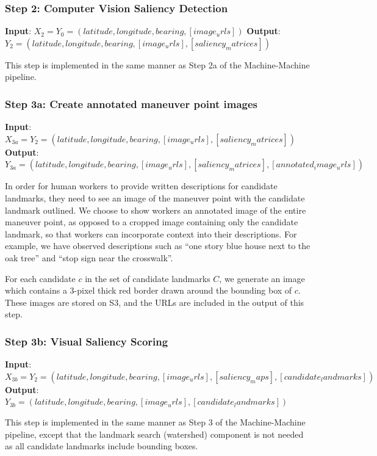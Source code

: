 \subsubsection*{Step 2: Computer Vision Saliency Detection}
\textbf{Input}: $X_2 = Y_0 = (latitude, longitude, bearing, [image_urls])$
\textbf{Output}: $Y_2 = (latitude, longitude, bearing, [image_urls], [saliency_matrices])$ 

This step is implemented in the same manner as Step 2a of the Machine-Machine pipeline.

\subsubsection*{Step 3a: Create annotated maneuver point images}
\textbf{Input}: $X_{3a} = Y_2 = (latitude, longitude, bearing, [image_urls], [saliency_matrices])$ 
\textbf{Output}: $Y_{3a} = (latitude, longitude, bearing, [image_urls], [saliency_matrices], [annotated_image_urls])$ 

In order for human workers to provide written descriptions for candidate landmarks, they need to see an image of the maneuver point with the candidate landmark outlined. We choose to show workers an annotated image of the entire maneuver point, as opposed to a cropped image containing only the candidate landmark, so that workers can incorporate context into their descriptions. For example, we have observed descriptions such as “one story blue house next to the oak tree” and “stop sign near the crosswalk”.

For each candidate $c$ in the set of candidate landmarks $C$, we generate an image which contains a 3-pixel thick red border drawn around the bounding box of $c$. These images are stored on S3, and the URLs are included in the output of this step.

\subsubsection*{Step 3b: Visual Saliency Scoring}

\textbf{Input}: $X_{3b} = Y_2 = (latitude, longitude, bearing,  [image_urls], [saliency_maps], [candidate_landmarks] )$
\textbf{Output}: $Y_{3b} = (latitude, longitude, bearing,  [image_urls], [candidate_landmarks] )$ 

This step is implemented in the same manner as Step 3 of the Machine-Machine pipeline, except that the landmark search (watershed) component is not needed as all candidate landmarks include bounding boxes.

